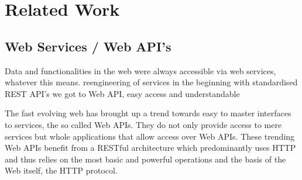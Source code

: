 \chapter{Related Work}

\section{Web Services / Web API's}
Data and functionalities in the web were always accessible via web services, whatever this means.
reengineering of services in the beginning
with standardised REST API's we got to Web API, easy access and understandable


The fast evolving web has brought up a trend towards easy to master interfaces to services, the so called Web APIs.
They do not only provide access to mere services but whole applications that allow access over Web APIs.
These trending Web APIs benefit from a RESTful architecture which predominantly uses HTTP and thus relies on the most basic and powerful operations and the basis of the Web itself, the HTTP protocol. 









